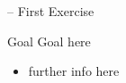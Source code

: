 \documentclass[presentation]{beamer}\mode<presentation>{\usetheme{AMSBolognaFC}}
\begin{document}
\startExercise

\begin{frame}{\currentExercise{} -- First Exercise}
	\begin{block}{Goal}
		Goal here
	\end{block}
	\begin{itemize}
		\item further info here
	\end{itemize}
\end{frame}

\section*{}

\frame{\titlepage}

\section*{\refname}

\begin{frame}[c,noframenumbering]{\refname}
	\scriptsize
	
	
\end{frame}

\end{document}
